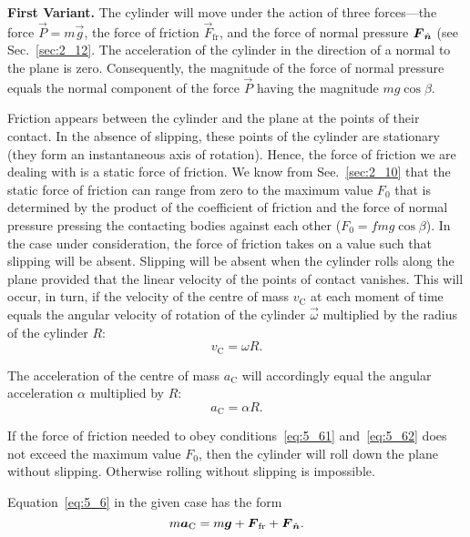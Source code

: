 \textbf{First Variant.} The cylinder will move under the action of three forces---the force $\vec{P}=m\vec{g}$, the force of friction $\vec{F}_{\text{fr}}$, and the force of normal pressure $\boldsymbol{F}_{\hat{\boldsymbol{n}}}$ (see Sec.~\ref{sec:2_12}. The acceleration of the cylinder in the direction of a normal to the plane is zero. Consequently, the magnitude of the force of normal pressure equals the normal component of the force $\vec{P}$ having the magnitude $mg\cos\beta$.

Friction appears between the cylinder and the plane at the points of their contact. In the absence of slipping, these points of the cylinder are stationary (they form an instantaneous axis of rotation). Hence, the force of friction we are dealing with is a static force of friction. We know from See.~\ref{sec:2_10} that the static force of friction can range from zero to the maximum value $F_0$ that is determined by the product of the coefficient of friction and the force of normal pressure pressing the contacting bodies against each other ($F_0=fmg\cos\beta$). In the case under consideration, the force of friction takes on a value such that slipping will be absent. Slipping will be absent when the cylinder rolls along the plane provided that the linear velocity of the points of contact vanishes. This will occur, in turn, if the velocity of the centre of mass $v_{\text{C}}$ at each moment of time equals the angular velocity of rotation of the cylinder $\vec{\omega}$ multiplied by the radius of the cylinder $R$:
\begin{equation}\label{eq:5_61}
	v_{\text{C}} = \omega R.
\end{equation}

\noindent
The acceleration of the centre of mass $a_{\text{C}}$ will accordingly equal the angular acceleration $\alpha$ multiplied by $R$:
\begin{equation}\label{eq:5_62}
	a_{\text{C}} = \alpha R.
\end{equation}

If the force of friction needed to obey conditions~\eqref{eq:5_61} and~\eqref{eq:5_62} does not exceed the maximum value $F_0$, then the cylinder will roll down the plane without slipping. Otherwise rolling without slipping is impossible.

Equation~\eqref{eq:5_6} in the given case has the form
\begin{equation*}
	m\boldsymbol{a}_{\text{C}} = m\boldsymbol{g} + \boldsymbol{F}_{\text{fr}} + \boldsymbol{F}_{\hat{\boldsymbol{n}}}.
\end{equation*}


